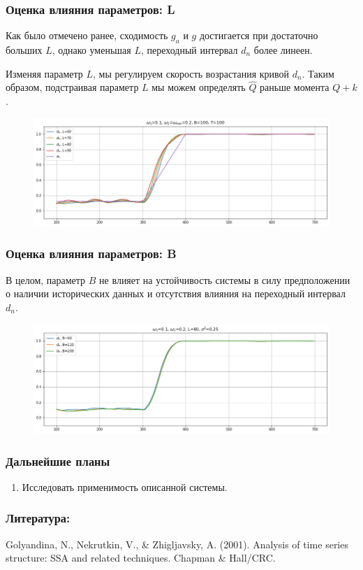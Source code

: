 \documentclass[11pt]{beamer}
\begin{document}
	\begin{frame}
		\frametitle{Оценка влияния параметров: L}
		Как было отмечено ранее, сходимость $ g_a $ и $ g $ достигается при достаточно больших $ L $, однако уменьшая $ L $, переходный интервал $ d_n $ более линеен.
		
		\bigskip
		
		Изменяя параметр $ L $, мы регулируем скорость возрастания кривой $ d_{n} $. Таким образом, подстраивая параметр $ L $ мы можем определять $ \hat{Q} $ раньше момента $ Q + k $.
		
		\begin{figure}[b]
			\centering
			\includegraphics[width=\linewidth]{imgs/row_diff_L.png}
		\end{figure}
		
		
	\end{frame}
	
	\begin{frame}
		\frametitle{Оценка влияния параметров: B}
		В целом, параметр $ B $ не влияет на устойчивость системы в силу предположении о наличии исторических данных и отсутствия влияния на переходный интервал $ d_n $.
		
		\begin{figure}[b]
			\centering
			\includegraphics[width=\linewidth]{imgs/row_diff_B.png}
		\end{figure}
		
	\end{frame}
	
	
	\begin{frame}
		\frametitle{Дальнейшие планы}
		\begin{enumerate}
			
			\item 
			Исследовать применимость описанной системы.
		\end{enumerate}
		
	\end{frame}
	
	
	\begin{frame}
		\frametitle{Литература:}
		\begin{thebibliography}{1}
			\bibitem{TSStructure}
			Golyandina, N., Nekrutkin, V., \& Zhigljavsky, A. (2001). Analysis of time series structure: SSA and related techniques. Chapman \& Hall/CRC.
			
		\end{thebibliography}
	\end{frame}
\end{document}
